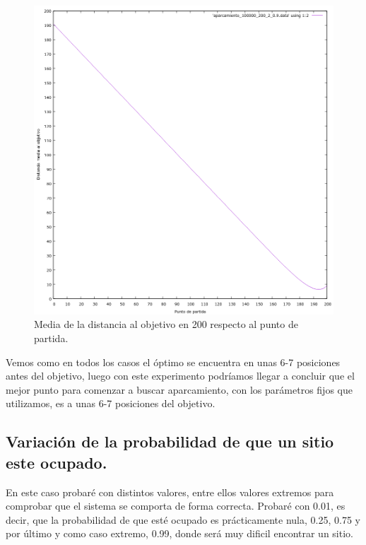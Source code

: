 \documentclass[12pt, spanish]{article}
\begin{document}
\begin{figure}[H]
	\centering
	\includegraphics[scale = 0.6]{aparcamiento_100000_200_2_0-9.png}
	\caption{Media de la distancia al objetivo en 200 respecto al punto de partida.}
	\label{fig:ej4}
\end{figure}

Vemos como en todos los casos el óptimo se encuentra en unas 6-7 posiciones antes del objetivo, luego con este experimento podríamos llegar a concluir que el mejor punto para comenzar a buscar aparcamiento, con los parámetros fijos que utilizamos, es a unas 6-7 posiciones del objetivo.



\newpage

\subsection{Variación de la probabilidad de que un sitio este ocupado.}

En este caso probaré con distintos valores, entre ellos valores extremos para comprobar que el sistema se comporta de forma correcta. Probaré con 0.01, es decir, que la probabilidad de que esté ocupado es prácticamente nula, 0.25, 0.75 y por último y como caso extremo, 0.99, donde será muy dificil encontrar un sitio.
\end{document}
